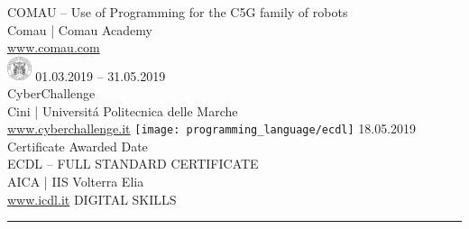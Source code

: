\documentclass[letterpaper, 11pt]{article}
\begin{document}
COMAU – Use of Programming for the C5G family of robots\\
Comau | Comau Academy\\
\href{https://www.comau.com}
{\textcolor{linked}{www.comau.com}}\\
\bigskip\newline
\includegraphics[width=1.9em]{logo/univpm}
01.03.2019 – 31.05.2019\\
CyberChallenge\\
Cini | Universit\'a Politecnica delle Marche\\
\href{https://cyberchallenge.it/}
{\textcolor{linked}{www.cyberchallenge.it}}
\bigskip\newline
\texttt{[image: programming\_language/ecdl]}
18.05.2019 Certificate Awarded Date\\
ECDL – FULL STANDARD CERTIFICATE\\
AICA | IIS Volterra Elia\\
\href{https://www.icdl.it/}
{\textcolor{linked}{www.icdl.it}}
\newpage
\textcolor{titlecolor}{DIGITAL SKILLS}
{\color{linecolor} \rule{0.8\linewidth}{0.5mm}}
\end{document}
